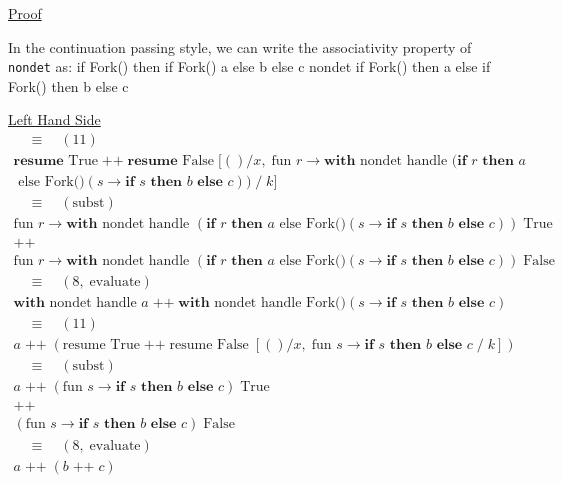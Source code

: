 \documentclass[logo,bsc,singlespacing,parskip]{infthesis}
\begin{document}
\underline{Proof}

In the continuation passing style, we can write the associativity property of \texttt{nondet} as:
{
if Fork() then
if Fork() 
a 
else 
b 
else 
c
}
{nondet}
{
if Fork() then a 
else 
if Fork() 
 then b 
 else c
}

\underline{Left Hand Side}
\[
\begin{array}{l}
\quad \equiv \quad (11) \\[5pt]
\textbf{resume }\text{True} \;\texttt{++}\; \textbf{resume } \text{False} \; [()/x,\; \text{fun } r \rightarrow \textbf{with } \text{nondet handle } (\textbf{if } r \textbf{ then } a \\ \text{ else Fork()}(s \rightarrow \textbf{if }  s \textbf{ then } b \textbf{ else } c)) \;/\; k] \\[5pt]

\quad \equiv \quad (\text{subst}) \\[5pt]
\text{fun } r \rightarrow \textbf{with } \text{nondet handle } (\textbf{if } r \textbf{ then } a \text{ else Fork()}(s \rightarrow \textbf{if } s \textbf{ then } b \textbf{ else } c)) \;\text{True} \\[2pt]
\texttt{++} \\ 
\text{fun } r \rightarrow \textbf{with } \text{nondet handle } (\textbf{if } r \textbf{ then } a \text{ else Fork()}(s \rightarrow \textbf{if } s \textbf{ then } b \textbf{ else } c)) \;\text{False} \\[5pt]

\quad \equiv \quad (8,\; \text{evaluate}) \\[5pt]
\textbf{with } \text{nondet handle } a \;\texttt{++}\; \textbf{with } \text{nondet handle } \text{Fork()}(s \rightarrow \textbf{if } s \textbf{ then } b \textbf{ else } c) \\[5pt]

\quad \equiv \quad (11) \\[5pt]
a \;\texttt{++}\; (\text{resume True} \;\texttt{++}\; \text{resume False} \; [()/x,\; \text{fun } s \rightarrow \textbf{if } s \textbf{ then } b \textbf{ else } c \;/\; k]) \\[5pt]

\quad \equiv \quad (\text{subst}) \\[5pt]
a \;\texttt{++}\; (\text{fun } s \rightarrow \textbf{if } s \textbf{ then } b \textbf{ else } c) \;\text{True} \\
\texttt{++} \\
(\text{fun } s \rightarrow \textbf{if } s \textbf{ then } b \textbf{ else } c) \;\text{False} \\[5pt]

\quad \equiv \quad (8,\; \text{evaluate}) \\[5pt]
a \;\texttt{++}\; (b \;\texttt{++}\; c)
\end{array}
\]
\end{document}
